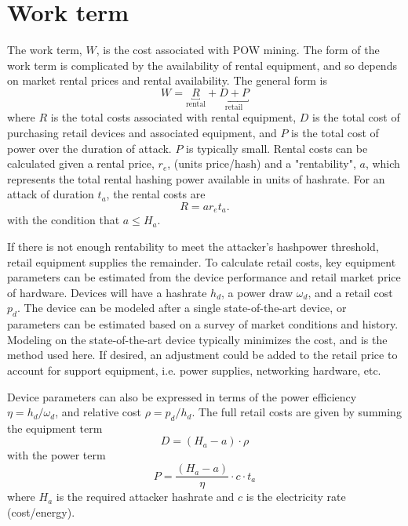 \documentclass[a4paper,12pt]{article}
\begin{document}
\section{Work term}

The work term, $W$, is the cost associated with POW mining. The form of the work term is complicated by the availability of rental equipment, and so depends on market rental prices and rental availability. The general form is
%
\begin{equation}
W =  \underbracket{R}_{\text{rental}} + \underbracket{D + P}_{\text{retail}}
\end{equation}
%
where $R$ is the total costs associated with rental equipment, $D$ is the total cost of purchasing retail devices and associated equipment, and $P$ is the total cost of power over the duration of attack. $ P $ is typically small. Rental costs can be calculated given a rental price, $r_e$, (units price/hash) and a "rentability", $a$,  which represents the total rental hashing power available in units of hashrate. For an attack of duration $t_a$, the rental costs are 
%
\begin{equation}
R = a r_e t_a.
\end{equation}
%
with the condition that $ a \le H_a $. 

If there is not enough rentability to meet the attacker's hashpower threshold, retail equipment supplies the remainder. To calculate retail costs, key equipment parameters can be estimated from the device performance and retail market price of hardware. Devices will have a hashrate $h_d$, a power draw $\omega_d$, and a retail cost $p_d$. The device can be modeled after a single state-of-the-art device, or parameters can be estimated based on a survey of market conditions and history. Modeling on the state-of-the-art device typically minimizes the cost, and is the method used here. If desired, an adjustment could be added to the retail price to account for support equipment, i.e. power supplies, networking hardware, etc. 

Device parameters can also be expressed in terms of the power efficiency $\eta = h_d / \omega_d$, and relative cost $\rho = p_d / h_d$. The full retail costs are given by summing the equipment term
%
\begin{equation}
D = ( H_a - a )  \cdot \rho
\end{equation}
%
with the power term
%
\begin{equation}
P = \frac{ ( H_a - a ) }{ \eta } \cdot c \cdot t_a
\end{equation}
%
where $H_a$ is the required attacker hashrate and $c$ is the electricity rate (cost/energy). 
\end{document}
